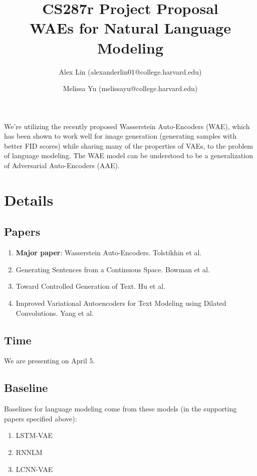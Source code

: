 \documentclass[11pt, margin=1in]{article}
\begin{document}
	
\title{CS287r Project Proposal \\ WAEs for Natural Language Modeling}
\author{Alex Lin (alexanderlin01@college.harvard.edu) \and Melissa Yu (melissayu@college.harvard.edu)}
\date{}
\maketitle

We're utilizing the recently proposed Wasserstein Auto-Encoders (WAE), which has been shown to work well for image generation (generating samples with better FID scores) while sharing many of the properties of VAEs, to the problem of language modeling. The WAE model can be understood to be a generalization of Adversarial Auto-Encoders (AAE).

\section{Details}
\subsection{Papers}
\begin{enumerate}
	\item \textbf{Major paper}: Wasserstein Auto-Encoders. Tolstikhin et al.
	\item Generating Sentences from a Continuous Space. Bowman et al.
	\item Toward Controlled Generation of Text. Hu et al.
	\item Improved Variational Autoencoders for Text Modeling using Dilated Convolutions. Yang et al.
\end{enumerate}

\subsection{Time}
We are presenting on April 5.

\subsection{Baseline} 
Baselines for language modeling come from these models (in the supporting papers specified above):
\begin{enumerate}
	\item LSTM-VAE
	\item RNNLM
	\item LCNN-VAE
\end{enumerate}
\end{document}
